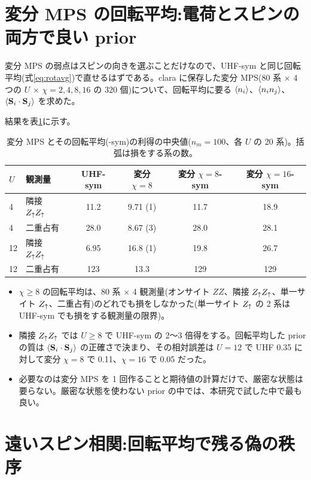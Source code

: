 \section{変分 MPS の回転平均:電荷とスピンの両方で良い prior}
\label{sec:varsym}

変分 MPS の弱点はスピンの向きを選ぶことだけなので、UHF-sym と同じ回転平均(式\eqref{eq:rotavg})で直せるはずである。clara に保存した変分 MPS(80 系 × 4 つの $U$ × $\chi=2,4,8,16$ の 320 個)について、回転平均に要る $\langle n_i\rangle$、$\langle n_in_j\rangle$、$\langle \mathbf S_i\cdot\mathbf S_j\rangle$ を求めた。

結果を表\ref{tab:varsym}に示す。
\begin{table}[t]
\centering\small
\caption{変分 MPS とその回転平均(-sym)の利得の中央値($n_m=100$、各 $U$ の 20 系)。括弧は損をする系の数。}
\label{tab:varsym}
\begin{tabular}{@{}llcccc@{}}
\toprule
$U$ & 観測量 & UHF-sym & 変分 $\chi{=}8$ & 変分 $\chi{=}8$-sym & 変分 $\chi{=}16$-sym \\
\midrule
4  & 隣接 $Z_\uparrow Z_\uparrow$ & 11.2 & 9.71 (1) & 11.7 & 18.9 \\
4  & 二重占有 & 28.0 & 8.67 (3) & 28.0 & 28.1 \\
12 & 隣接 $Z_\uparrow Z_\uparrow$ & 6.95 & 16.8 (1) & 19.8 & 26.7 \\
12 & 二重占有 & 123 & 13.3 & 129 & 129 \\
\bottomrule
\end{tabular}
\end{table}

\begin{itemize}
  \item $\chi\ge8$ の回転平均は、80 系 × 4 観測量(オンサイト $ZZ$、隣接 $Z_\uparrow Z_\uparrow$、単一サイト $Z_\uparrow$、二重占有)のどれでも損をしなかった(単一サイト $Z_\uparrow$ の 2 系は UHF-sym でも損をする観測量の限界)。
  \item 隣接 $Z_\uparrow Z_\uparrow$ では $U\ge8$ で UHF-sym の 2〜3 倍得をする。回転平均した prior の質は $\langle \mathbf S_i\cdot\mathbf S_j\rangle$ の正確さで決まり、その相対誤差は $U=12$ で UHF 0.35 に対して変分 $\chi=8$ で 0.11、$\chi=16$ で 0.05 だった。
  \item 必要なのは変分 MPS を 1 回作ることと期待値の計算だけで、厳密な状態は要らない。厳密な状態を使わない prior の中では、本研究で試した中で最も良い。
\end{itemize}

\section{遠いスピン相関:回転平均で残る偽の秩序}
\label{sec:distance}

